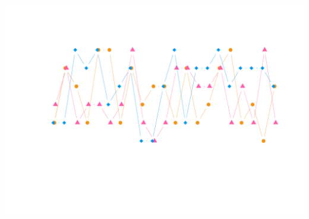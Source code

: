 \documentclass{article}\usepackage[]{graphicx}\usepackage[]{color}
\newenvironment{knitrout}{}{} %
\begin{document}
\begin{knitrout}
\includegraphics[width=\textwidth]{figure/dice1-7} 

\end{knitrout}
\end{document}
